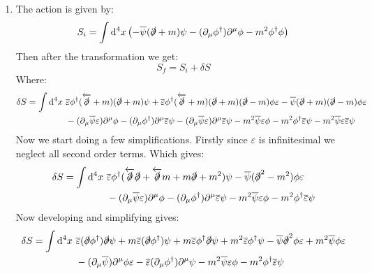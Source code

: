 \documentclass[10pt,a4paper]{article}
\begin{document}
\begin{enumerate}
\item The action is given by:
\[
S_i = \int \dd^4 x \left( - \overline{\psi} (\slashed{\partial} + m) \psi - (\partial_\mu \phi^\dagger) \partial^\mu \phi - m^2 \phi^\dagger \phi \right)
\]
Then after the transformation we get:
\[
S_f = S_i + \delta S
\]
Where:
\begin{align*}
\delta S = \int \dd^4 x \,\, &\overline{\varepsilon} \phi^\dagger (\overleftarrow{\slashed{\partial}} + m)(\slashed{\partial} + m)\psi +  \overline{\varepsilon} \phi^\dagger (\overleftarrow{\slashed{\partial}} + m)(\slashed{\partial} + m)(\slashed{\partial} - m)\phi \varepsilon - \overline{\psi}(\slashed{\partial} + m) (\slashed{\partial} - m) \phi \varepsilon \\
&- (\partial_\mu \overline{\psi} \varepsilon) \partial^\mu \phi - (\partial_\mu \phi^\dagger) \partial^\mu \overline{\varepsilon} \psi - (\partial_\mu \overline{\psi} \varepsilon) \partial^\mu \overline{\varepsilon} \psi - m^2 \overline{\psi} \varepsilon \phi - m^2 \phi^\dagger \overline{\varepsilon} \psi - m^2 \overline{\psi} \varepsilon \overline{\varepsilon} \psi
\end{align*}
Now we start doing a few simplifications. Firstly since $\varepsilon$ is infinitesimal we neglect all second order terms. Which gives:
\begin{align*}
\delta S = \int \dd^4 x \,\, &\overline{\varepsilon} \phi^\dagger (\overleftarrow{\slashed{\partial}} \slashed{\partial} + \overleftarrow{\slashed{\partial}} m + m \slashed{\partial} + m^2)\psi - \overline{\psi}(\slashed{\partial}^2 - m^2) \phi \varepsilon \\
&- (\partial_\mu \overline{\psi} \varepsilon) \partial^\mu \phi - (\partial_\mu \phi^\dagger) \partial^\mu \overline{\varepsilon} \psi - m^2 \overline{\psi} \varepsilon \phi - m^2 \phi^\dagger \overline{\varepsilon} \psi 
\end{align*}
Now developing and simplifying gives:
\begin{align*}
\delta S = \int \dd^4 x \,\, &\overline{\varepsilon}(\slashed{\partial} \phi^\dagger) \slashed{\partial} \psi + m \overline{\varepsilon} (\slashed{\partial} \phi^\dagger) \psi + m \overline{\varepsilon} \phi^\dagger \slashed{\partial} \psi + m^2 \overline{\varepsilon}\phi^\dagger \psi - \overline{\psi} \slashed{\partial}^2 \phi \varepsilon + m^2 \overline{\psi} \phi \varepsilon \\
&- (\partial_\mu \overline{\psi})\partial^\mu \phi \varepsilon - \overline{\varepsilon} (\partial_\mu \phi^\dagger) \partial^\mu \psi - m^2 \overline{\psi} \varepsilon \phi - m^2 \phi^\dagger \overline{\varepsilon}\psi

\end{align*}
\end{enumerate}
\end{document}
